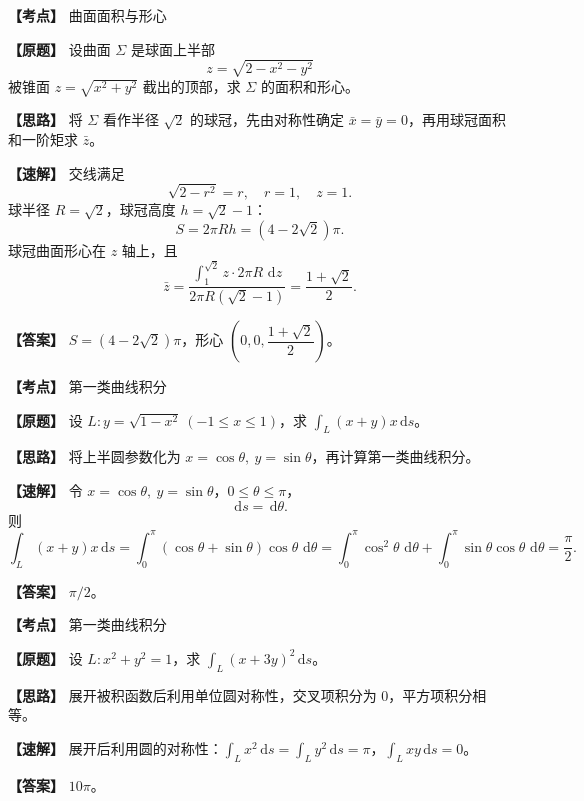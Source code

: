 ﻿\documentclass[11pt,a4paper,UTF8]{ctexart}
\newcommand{\dd}{\,\mathrm d}
\begin{document}
\begin{answerbox}[2023--2024 三-1]
\textbf{【考点】} 曲面面积与形心

\textbf{【原题】} 设曲面 $\Sigma$ 是球面上半部
\[
z=\sqrt{2-x^2-y^2}
\]
被锥面 $z=\sqrt{x^2+y^2}$ 截出的顶部，求 $\Sigma$ 的面积和形心。

\textbf{【思路】} 将 $\Sigma$ 看作半径 $\sqrt2$ 的球冠，先由对称性确定 $\bar x=\bar y=0$，再用球冠面积和一阶矩求 $\bar z$。

\textbf{【速解】} 交线满足
\[
\sqrt{2-r^2}=r,\quad r=1,\quad z=1.
\]
球半径 $R=\sqrt2$，球冠高度 $h=\sqrt2-1$：
\[
S=2\pi Rh=(4-2\sqrt2)\pi.
\]
球冠曲面形心在 $z$ 轴上，且
\[
\bar z=\frac{\int_1^{\sqrt2}z\cdot 2\pi R\,\dd z}{2\pi R(\sqrt2-1)}
=\frac{1+\sqrt2}{2}.
\]

\textbf{【答案】} $S=(4-2\sqrt2)\pi$，形心 $\left(0,0,\dfrac{1+\sqrt2}{2}\right)$。
\end{answerbox}

\begin{answerbox}[2023--2024 一-3]
\textbf{【考点】} 第一类曲线积分

\textbf{【原题】} 设 $L:y=\sqrt{1-x^2}\ (-1\le x\le1)$，求 $\displaystyle \int_L (x+y)x\dd s$。

\textbf{【思路】} 将上半圆参数化为 $x=\cos\theta,\ y=\sin\theta$，再计算第一类曲线积分。

\textbf{【速解】} 令 $x=\cos\theta,\ y=\sin\theta$，$0\le\theta\le\pi$，
\[
\dd s=\dd\theta.
\]
则
\[
\int_L(x+y)x\dd s
=\int_0^\pi(\cos\theta+\sin\theta)\cos\theta\,\dd\theta
=\int_0^\pi\cos^2\theta\,\dd\theta+\int_0^\pi\sin\theta\cos\theta\,\dd\theta
=\frac\pi2.
\]

\textbf{【答案】} $\pi/2$。
\end{answerbox}

\begin{answerbox}[2022--2023 一-4]
\textbf{【考点】} 第一类曲线积分

\textbf{【原题】} 设 $L:x^2+y^2=1$，求 $\displaystyle \int_L (x+3y)^2\dd s$。

\textbf{【思路】} 展开被积函数后利用单位圆对称性，交叉项积分为 $0$，平方项积分相等。

\textbf{【速解】} 展开后利用圆的对称性：$\int_Lx^2\dd s=\int_Ly^2\dd s=\pi$，$\int_Lxy\dd s=0$。

\textbf{【答案】} $10\pi$。
\end{answerbox}
\end{document}

